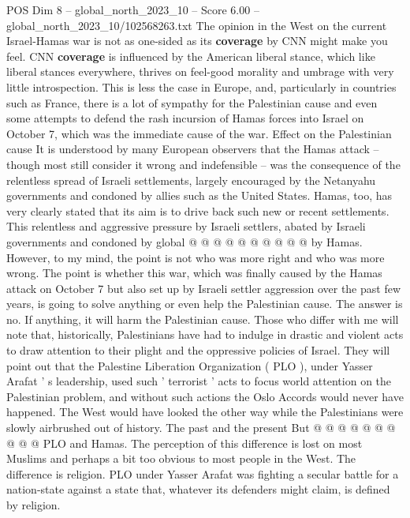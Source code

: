 \begin{textsample}{POS Dim 8 – global\_north\_2023\_10 – Score 6.00 – global\_north\_2023\_10/102568263.txt}  \label{ex:f8_pos_201}
The opinion in the West on the current Israel-Hamas war is not as one-sided as its \textbf{coverage} by CNN might make you feel.
CNN \textbf{coverage} is influenced by the American liberal stance, which like liberal stances everywhere, thrives on feel-good morality and umbrage with very little introspection.
This is less the case in Europe, and, particularly in countries such as France, there is a lot of sympathy for the Palestinian cause and even some attempts to defend the rash incursion of Hamas forces into Israel on October 7, which was the immediate cause of the war.
Effect on the Palestinian cause It is understood by many European observers that the Hamas attack -- though most still consider it wrong and indefensible -- was the consequence of the relentless spread of Israeli settlements, largely encouraged by the Netanyahu governments and condoned by allies such as the United States.
Hamas, too, has very clearly stated that its aim is to drive back such new or recent settlements.
This relentless and aggressive pressure by Israeli settlers, abated by Israeli governments and condoned by global @ @ @ @ @ @ @ @ @ @ by Hamas.
However, to my mind, the point is not who was more right and who was more wrong.
The point is whether this war, which was finally caused by the Hamas attack on October 7 but also set up by Israeli settler aggression over the past few years, is going to solve anything or even help the Palestinian cause.
The answer is no.
If anything, it will harm the Palestinian cause.
Those who differ with me will note that, historically, Palestinians have had to indulge in drastic and violent acts to draw attention to their plight and the oppressive policies of Israel.
They will point out that the Palestine Liberation Organization ( PLO ), under Yasser Arafat ' s leadership, used such ' terrorist ' acts to focus world attention on the Palestinian problem, and without such actions the Oslo Accords would never have happened.
The West would have looked the other way while the Palestinians were slowly airbrushed out of history.
The past and the present But @ @ @ @ @ @ @ @ @ @ PLO and Hamas.
The perception of this difference is lost on most Muslims and perhaps a bit too obvious to most people in the West.
The difference is religion.
PLO under Yasser Arafat was fighting a secular battle for a nation-state against a state that, whatever its defenders might claim, is defined by religion.

\end{textsample}
